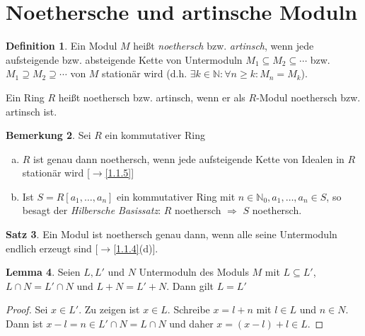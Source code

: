 \documentclass[
twoside=semi,
fontsize=12,
DIV=12, 
cleardoublepage=current,
leqno,
headings=optiontoheadandtoc, 
toc=idx
]{scrbook}
\newcommand{\N}{\mathbb{N}}
\theoremstyle{definition}
\newtheorem{definition}{Definition}[section]
\newtheorem{bemerkung}[definition]{Bemerkung}
\newtheorem{satz}[definition]{Satz}
\newtheorem{lemma}[definition]{Lemma}
\begin{document}
	\section{Noethersche und artinsche Moduln}
	\begin{definition}\label{1.4.1}
		Ein Modul $M$ hei\ss t \emph{noethersch} bzw. \emph{artinsch}, wenn jede aufsteigende bzw. absteigende Kette von Untermoduln $M_1 \subseteq M_2 \subseteq \cdots$ bzw. $M_1 \supseteq M_2 \supseteq \cdots$ von $M$ station\"ar wird (d.h. $\exists k \in \N: \forall n \geq k: M_n = M_k$).
		
		\noindent Ein Ring $R$ hei\ss t noethersch bzw. artinsch, wenn er als $R$-Modul noethersch bzw. artinsch ist.
	\end{definition}

	\begin{bemerkung}\label{1.4.2}
		Sei $R$ ein kommutativer Ring
		
		\begin{enumerate}[(a)]
			\item $R$ ist genau dann noethersch, wenn jede aufsteigende Kette von Idealen in $R$ station\"ar wird [$\to$\ref{1.1.5}]
			
			\item Ist $S = R[a_1, \dots, a_n]$ ein kommutativer Ring mit $n \in \N_0, a_1, \dots, a_n \in S$, so besagt der \emph{Hilbersche Basissatz}:
				$R$ noethersch $\Rightarrow$ $S$ noethersch.
		\end{enumerate}
	\end{bemerkung}

	\begin{satz}\label{1.4.3}
		Ein Modul ist noethersch genau dann, wenn alle seine Untermoduln endlich erzeugt sind [$\rightarrow$\ref{1.1.4}(d)].
	\end{satz}

	\begin{lemma}\label{1.4.4}
		Seien $L, L'$ und $N$ Untermoduln des Moduls $M$ mit $L \subseteq L'$, $L \cap N = L' \cap N$ und $L+N=L'+N$. Dann gilt $L=L'$
		
		\begin{proof}
			Sei $x \in L'$. Zu zeigen ist $x \in L$. Schreibe $x = l + n$ mit $l \in L$ und $n \in N$. Dann ist $x-l = n \in L' \cap N = L \cap N$ und daher $x = (x-l)+l \in L$. 
		\end{proof}
	\end{lemma}
\end{document}
